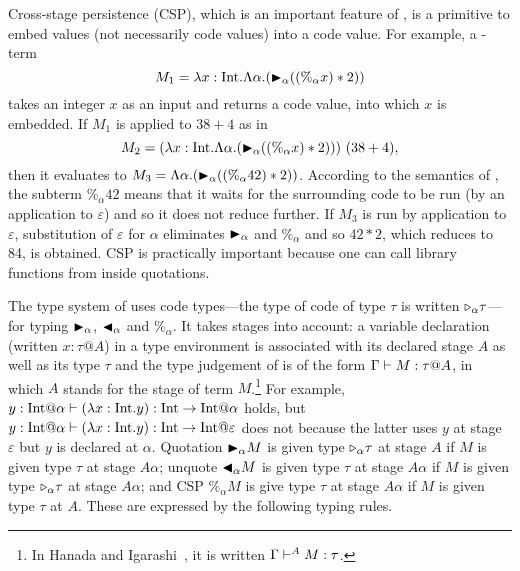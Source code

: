 
Cross-stage persistence (CSP), which is an important feature of \LTP,
is a primitive to embed values (not necessarily code values) into a
code value.  For example, a \LTP-term
\[
  M_1 = \lambda x:\textrm{Int}.\Lambda\alpha.({\mathop{\blacktriangleright}}_\alpha ((\%_\alpha x) * 2))
\]
takes an integer \(x\) as an input and returns a code value, into
which \(x\) is embedded.  If $M_1$ is applied to $38 + 4$ as in
\[
  M_2 = (\lambda x:\textrm{Int}.\Lambda\alpha.({\mathop{\blacktriangleright}}_\alpha ((\%_\alpha x) * 2)))\ (38 + 4),
\]
then it evaluates to \(M_3 = \Lambda\alpha.({\mathop{\blacktriangleright}}_\alpha ((\%_\alpha 42) * 2))\).
According to the semantics of \LTP, the subterm $\%_\alpha 42$ means that it
waits for the surrounding code to be run (by an application to $\varepsilon$)
and so it does not reduce further.  If \(M_3\) is run by application to
\(\varepsilon\), substitution of \(\varepsilon\) for \(\alpha\) eliminates
\({\mathop{\blacktriangleright}}_\alpha\) and \(\%_\alpha\) and so \(42 * 2\), which reduces to 84, is
obtained.  CSP is practically important because one can call library functions
from inside quotations.


The type system of \LTP uses code types---the type of code of type
\(\tau\) is written \({\mathop{\triangleright}}_\alpha \tau\)---for typing \({\mathop{\blacktriangleright}}_\alpha\),
\({\mathop{\blacktriangleleft}}_\alpha\) and \(\%_\alpha\).  It takes stages into account: a
variable declaration (written $x:\tau@A$) in a type environment is associated with its
declared stage $A$ as well as its type $\tau$ and the type judgement of \LTP is of
the form $\G \vdash M : \tau@A$, in which $A$ stands for the stage
of term $M$.\footnote{%
  In Hanada and Igarashi~\cite{Hanada2014}, it is written
  $\Gamma \vdash^A M : \tau$.
  }
For example,
$y:\I@\alpha \vdash (\lambda x:\I.y) : \I \to \I @ \alpha$ holds, but
$y:\I@\alpha \vdash (\lambda x:\I.y) : \I \to \I @ \varepsilon$ does
not because the latter uses $y$ at stage \(\varepsilon\) but $y$ is
declared at $\alpha$.  Quotation \({\mathop{\blacktriangleright}}_\alpha M\) is given type
\({\mathop{\triangleright}}_\alpha \tau\) at stage \(A\) if \(M\) is given type \(\tau\) at
stage \(A\alpha\); unquote \({\mathop{\blacktriangleleft}}_\alpha M\) is given type \(\tau\)
at stage \(A\alpha\) if \(M\) is given type \({\mathop{\triangleright}}_\alpha \tau\) at
stage \(A\alpha\); and CSP \(\%_\alpha M\) is give type \(\tau\)
at stage \(A\alpha\) if \(M\) is given type \(\tau\) at \(A\).
These are expressed by the following typing rules.
\begin{center}
	 \hfil
	 \hfil
\end{center}

